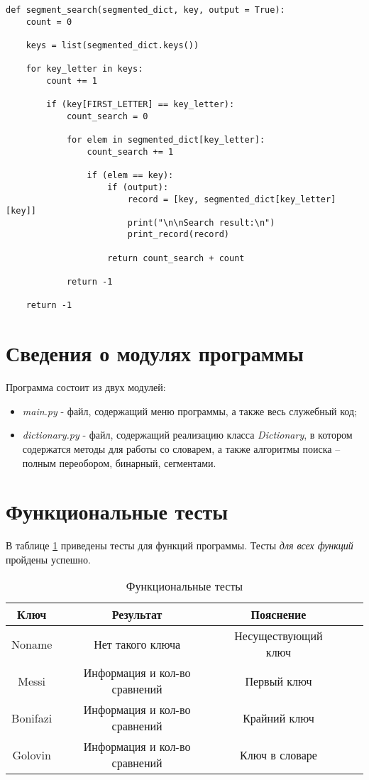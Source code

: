 \begin{center}
    \captionsetup{justification=raggedright,singlelinecheck=off}
    \begin{lstlisting}[label=lst:segm_search,caption=Алгоритм поиска в словаре с использованием сегментации]
def segment_search(segmented_dict, key, output = True):
	count = 0

	keys = list(segmented_dict.keys())

	for key_letter in keys:
		count += 1

		if (key[FIRST_LETTER] == key_letter):
			count_search = 0

			for elem in segmented_dict[key_letter]:
				count_search += 1

				if (elem == key):
					if (output):
						record = [key, segmented_dict[key_letter][key]]
						print("\n\nSearch result:\n")     
						print_record(record)

					return count_search + count

			return -1

	return -1
\end{lstlisting}
\end{center}


\section{Сведения о модулях программы}
Программа состоит из двух модулей:
\begin{itemize}
	\item \textit{main.py} - файл, содержащий меню программы, а также весь служебный код;
    \item \textit{dictionary.py} - файл, содержащий реализацию класса \textit{Dictionary}, в котором содержатся методы для работы со словарем, а также алгоритмы поиска -- полным переобором, бинарный, сегментами.
\end{itemize}


\section{Функциональные тесты}

В таблице \ref{tbl:functional_test} приведены тесты для функций программы. Тесты \textit{для всех функций} пройдены успешно.

\begin{center}
    \captionsetup{justification=raggedright,singlelinecheck=off}
    \begin{longtable}[c]{|c|c|c|c|c|}
    \caption{Функциональные тесты\label{tbl:functional_test}} \\ \hline
		\textbf{Ключ} & \textbf{Результат} & \textbf{Пояснение} \\ \hline
		Noname & Нет такого ключа & Несуществующий ключ \\ \hline
		Messi & Информация и кол-во сравнений & Первый ключ \\ \hline
		Bonifazi & Информация и кол-во сравнений & Крайний ключ \\ \hline
		Golovin & Информация и кол-во сравнений & Ключ в словаре \\
		\hline
	\end{longtable}
\end{center}

